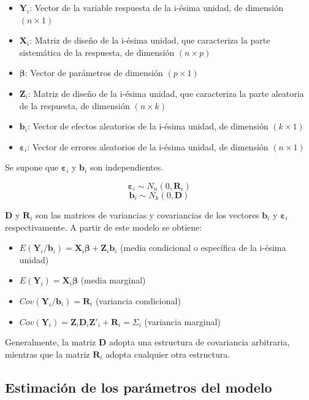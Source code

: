 \documentclass[spanish]{article}
\numberwithin{figure}{subsection}
\numberwithin{equation}{subsection}
\numberwithin{table}{subsection}
\begin{document}
\begin{itemize}
	\item $\bm{Y}_i$: Vector de la variable respuesta de la i-ésima unidad, de
	dimensión $(n \times 1)$
	\item $\bm{X}_i$: Matriz de diseño de la i-ésima unidad, que caracteriza la
	parte sistemática de la respuesta, de dimensión $(n \times p)$
	\item $\bm{\beta}$: Vector de parámetros de dimensión $(p \times 1)$
	\item $\bm{Z}_i$: Matriz de diseño de la i-ésima unidad, que caracteriza la
	parte aleatoria de la respuesta, de dimensión $(n \times k)$
	\item $\bm{b}_i$: Vector de efectos aleatorios de la i-ésima unidad, de
	dimensión $(k \times 1)$
	\item $\bm{\varepsilon}_i$: Vector de errores aleatorios de la i-ésima unidad,
	de dimensión $(n \times 1)$
\end{itemize}

Se supone que $\bm{\varepsilon}_i$ y $\bm{b}_i$ son independientes.

\[ \bm{\varepsilon}_i \sim N_{n}(0, \bm{R}_i) \]
\[ \bm{b}_i \sim N_k(0, \bm{D}) \]

$\bm{D}$ y $\bm{R}_i$ son las matrices de variancias y covariancias de los
vectores $\bm{b}_i$ y $\bm{\varepsilon}_i$ respectivamente. A partir de este
modelo se obtiene:

\begin{itemize}
	\item $E(\bm{Y}_i/\bm{b}_i) = \bm{X}_i\bm{\beta} + \bm{Z}_i\bm{b}_i$ (media condicional o específica de
	la i-ésima unidad)
	\item $E(\bm{Y}_i) = \bm{X}_i\bm{\beta}$ (media marginal)
	\item $Cov(\bm{Y}_i/\bm{b}_i) = \bm{R}_i$ (variancia condicional)
	\item $Cov(\bm{Y}_i) = \bm{Z}_i \bm{D}_i \bm{Z}'_i + \bm{R}_i = \bm{\varSigma}_i$ (variancia marginal)
\end{itemize}

Generalmente, la matriz $\bm{D}$ adopta una estructura de covariancia arbitraria,
mientras que la matriz $\bm{R}_i$ adopta cualquier otra estructura.

\subsection{Estimación de los parámetros del modelo}
\end{document}
